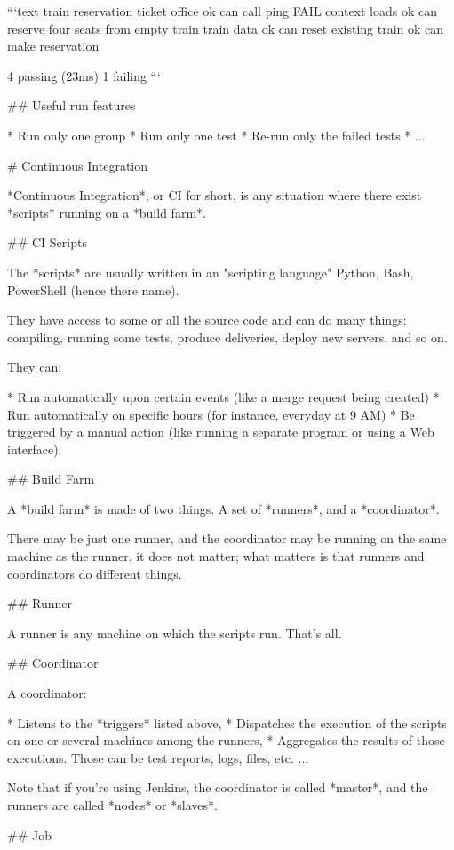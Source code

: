 ```text
  train reservation
    ticket office
      ok can call ping
      FAIL context loads
      ok can reserve four seats from empty train
    train data
      ok can reset existing train
      ok can make reservation

  4 passing (23ms)
  1 failing
```

## Useful run features

* Run only one group
* Run only one test
* Re-run only the failed tests
* ...

# Continuous Integration

*Continuous Integration*, or CI for short, is any situation where there
exist *scripts* running on a *build farm*.

## CI Scripts

The *scripts* are usually written in an "scripting language" Python, Bash, PowerShell
(hence
there name).

They have access to some or all the source code and can do many things:
compiling, running some tests, produce deliveries, deploy new servers,
and so on.

They can:

  * Run automatically upon certain events (like a merge request being created)
  * Run automatically on specific hours (for instance, everyday at 9 AM)
  * Be triggered by a manual action (like running a separate program or using a Web interface).


## Build Farm

A *build farm* is made of two things. A set of *runners*, and a *coordinator*.

There may be just one runner, and the coordinator may be running on the
same machine as the runner, it does not matter; what matters is that
runners and coordinators do different things.

## Runner

A runner is any machine on which the scripts run. That's all.

## Coordinator

A coordinator:

  * Listens to the *triggers* listed above,
  * Dispatches the execution of the scripts on one or several machines among the runners,
  * Aggregates the results of those executions. Those can be test reports, logs, files, etc. ...

Note that if you're using Jenkins, the coordinator is called *master*, and the runners are called *nodes* or *slaves*.

## Job


